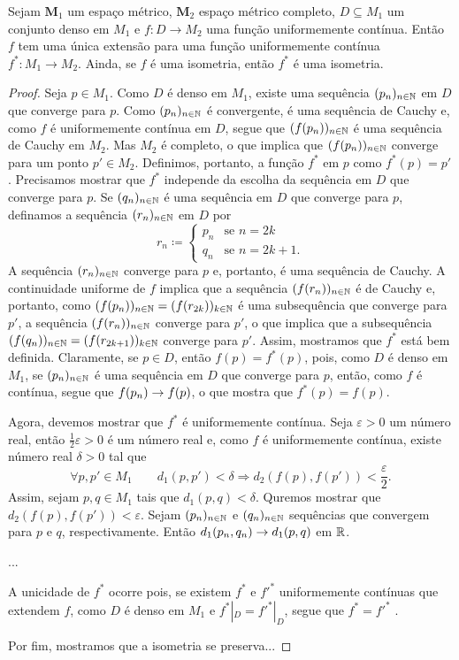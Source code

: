 \begin{teo}
Sejam $\bm M_1$  um espaço métrico, $\bm M_2$ espaço métrico completo, $D \subseteq M_1$ um conjunto denso em $M_1$ e $f: D \to M_2$ uma função uniformemente contínua. Então $f$ tem uma única extensão para uma função uniformemente contínua $f^*: M_1 \to M_2$. Ainda, se $f$ é uma isometria, então $f^*$ é uma isometria.
\end{teo}
\begin{proof}
	Seja $p \in M_1$. Como $D$ é denso em $M_1$, existe uma sequência $(p_n)_{n \in \mathbb{N}}$ em $D$ que converge para $p$. Como $(p_n)_{n \in \mathbb{N}}$ é convergente, é uma sequência de Cauchy e, como $f$ é uniformemente contínua em $D$, segue que $(f(p_n))_{n \in \mathbb{N}}$ é uma sequência de Cauchy em $M_2$. Mas $M_2$ é completo, o que implica que $(f(p_n))_{n \in \mathbb{N}}$ converge para um ponto $p' \in M_2$. Definimos, portanto, a função $f^*$ em $p$ como $f^*(p)=p'$. Precisamos mostrar que $f^*$ independe da escolha da sequência em $D$ que converge para $p$. Se $(q_n)_{n \in \mathbb{N}}$ é uma sequência em $D$ que converge para $p$, definamos a sequência $(r_n)_{n \in \mathbb{N}}$ em $D$ por
	\begin{equation*}
	r_n \coloneqq
			\begin{cases}
			p_n &\text{se $n=2k$}\\
			q_n &\text{se $n=2k+1$}.
			\end{cases}
	\end{equation*}
A sequência $(r_n)_{n \in \mathbb{N}}$ converge para $p$ e, portanto, é uma sequência de Cauchy. A continuidade uniforme de $f$ implica que a sequência $(f(r_n))_{n \in \mathbb{N}}$ é de Cauchy e, portanto, como $(f(p_n))_{n \in \mathbb{N}}=(f(r_{2k}))_{k \in \mathbb{N}}$ é uma subsequência que converge para $p'$, a sequência $(f(r_n))_{n \in \mathbb{N}}$ converge para $p'$, o que implica que a subsequência $(f(q_n))_{n \in \mathbb{N}}=(f(r_{2k+1}))_{k \in \mathbb{N}}$ converge para $p'$. Assim, mostramos que $f^*$ está bem definida. Claramente, se $p \in D$, então $f(p)=f^*(p)$, pois, como $D$ é denso em $M_1$, se $(p_n)_{n \in \mathbb{N}}$ é uma sequência em $D$ que converge para $p$, então, como $f$ é contínua, segue que $f(p_n) \rightarrow f(p)$, o que mostra que $f^*(p)=f(p)$.

	Agora, devemos mostrar que $f^*$ é uniformemente contínua. Seja $\varepsilon > 0$ um número real, então $\frac{1}{2}\varepsilon > 0$ é um número real e, como $f$ é uniformemente contínua, existe número real $\delta > 0$ tal que
	\begin{equation*}
	\forall p,p' \in M_1 \qquad d_1(p,p') < \delta \Rightarrow d_2(f(p),f(p')) < \frac{\varepsilon}{2}.
	\end{equation*}
Assim, sejam $p,q \in M_1$ tais que $d_1(p,q) < \delta$. Quremos mostrar que $d_2(f(p),f(p')) < \varepsilon$. Sejam $(p_n)_{n \in \mathbb{N}}$ e $(q_n)_{n \in \mathbb{N}}$ sequências que convergem para $p$ e $q$, respectivamente. Então $d_1(p_n,q_n) \rightarrow d_1(p,q)$ em $\mathbb{R}$.

...

	A unicidade de $f^*$ ocorre pois, se existem $f^*$ e $f'^*$ uniformemente contínuas que extendem $f$, como $D$ é denso em $M_1$ e $f^*|_D = f'^*|_D$, segue que $f^* = f'^*$ .
	
	Por fim, mostramos que a isometria se preserva...
\end{proof}

